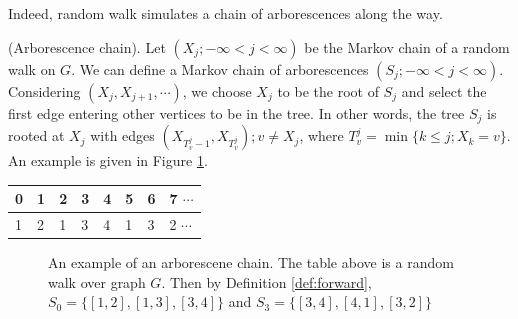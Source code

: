 Indeed, random walk simulates a chain of arborescences along the way.

\begin{definition}{(Arborescence chain).}
Let $(X_j; -\infty < j < \infty)$ be the Markov chain of a random walk on $G$. We can define a Markov chain of arborescences $(S_j; -\infty < j < \infty)$. Considering $(X_j, X_{j+1}, \cdots)$, we choose $X_j$ to be the root of $S_j$ and select the first edge entering other vertices to be in the tree. In other words, the tree $S_j$ is rooted at $X_j$ with edges $(X_{T_v^j - 1}, X_{T_v^j}); v \neq X_j$, where $T_v^j = \min \{k \leq j; X_k = v\}$. An example is given in Figure \ref{fig:example-forward}.
\label{def:forward}
\end{definition}

\begin{table}[h]
\centering
\begin{tabular}{llllllll}
0 & 1 & 2 & 3 & 4 & 5 & 6 & 7 $\cdots$\\ \hline
1 & 2 & 1 & 3 & 4 & 1 & 3 & 2 $\cdots$ 
\end{tabular}
\end{table}

\begin{figure}[h]
    \centering
    \qquad
    \qquad
    \caption{An example of an arborescene chain. The table above is a random walk over graph $G$. Then by Definition \ref{def:forward}, $S_0 = \{[1, 2], [1, 3], [3, 4]\}$ and $S_3 = \{[3, 4], [4,1], [3,2] \}$}%
    \label{fig:example-forward}%
\end{figure}


